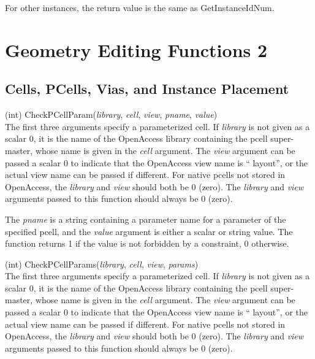 \begin{description}
For other instances, the return value is the same as {\vt
GetInstanceIdNum}.
\end{description}

\section{Geometry Editing Functions 2}
\subsection{Cells, PCells, Vias, and Instance Placement}

\begin{description}
\item{(int) \vt CheckPCellParam({\it library\/}, {\it cell\/},
{\it view\/}, {\it pname\/}, {\it value\/})}\\
The first three arguments specify a parameterized cell.
\ifoa
If {\it library} is not given as a scalar 0, it is the name of the
OpenAccess library containing the pcell super-master, whose name is
given in the {\it cell} argument.  The {\it view} argument can be
passed a scalar 0 to indicate that the OpenAccess view name is ``{\vt
layout}'', or the actual view name can be passed if different.  For
{\Xic} native pcells not stored in OpenAccess, the {\it library} and
{\it view} should both be 0 (zero).
\else
The {\it library} and {\it view} arguments passed to this function
should always be 0 (zero).
\fi

The {\it pname} is a string containing a parameter name for a
parameter of the specified pcell, and the {\it value} argument is
either a scalar or string value.  The function returns 1 if the value
is not forbidden by a constraint, 0 otherwise.

\item{(int) \vt CheckPCellParams({\it library\/}, {\it cell\/},
{\it view\/}, {\it params\/})}\\
The first three arguments specify a parameterized cell.
\ifoa
If {\it library} is not given as a scalar 0, it is the name of the
OpenAccess library containing the pcell super-master, whose name is
given in the {\it cell} argument.  The {\it view} argument can be
passed a scalar 0 to indicate that the OpenAccess view name is ``{\vt
layout}'', or the actual view name can be passed if different.  For
{\Xic} native pcells not stored in OpenAccess, the {\it library} and
{\it view} should both be 0 (zero).
\else
The {\it library} and {\it view} arguments passed to this function
should always be 0 (zero).
\fi


\end{description}

